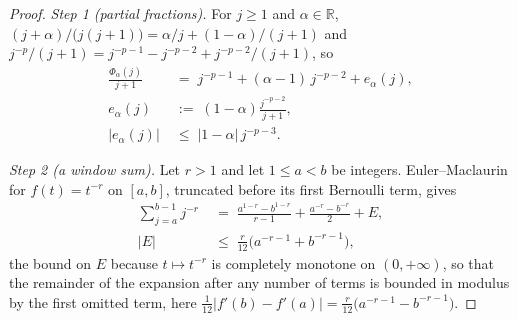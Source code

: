 \begin{proof}
\emph{Step 1 (partial fractions).} For $j\geq1$ and $\alpha\in\mathbb R$,
$(j+\alpha)/\bigl(j(j+1)\bigr)=\alpha/j+(1-\alpha)/(j+1)$ and
$j^{-p}/(j+1)=j^{-p-1}-j^{-p-2}+j^{-p-2}/(j+1)$, so
\begin{equation}\label{eq:doubling_pf}
\begin{aligned}
    \frac{\Phi_\alpha(j)}{j+1}\;&=\;j^{-p-1}+(\alpha-1)\,j^{-p-2}+e_\alpha(j),\\
    e_\alpha(j)\;&:=\;(1-\alpha)\frac{j^{-p-2}}{j+1},\\
    |e_\alpha(j)|\;&\leq\;|1-\alpha|\,j^{-p-3} .
\end{aligned}
\end{equation}

\emph{Step 2 (a window sum).} Let $r>1$ and let $1\leq a<b$ be integers. Euler--Maclaurin for
$f(t)=t^{-r}$ on $[a,b]$, truncated before its first Bernoulli term, gives
\begin{equation}\label{eq:doubling_em}
\begin{aligned}
    \sum_{j=a}^{b-1}j^{-r}\;&=\;\frac{a^{1-r}-b^{1-r}}{r-1}+\frac{a^{-r}-b^{-r}}{2}+E,\\
    |E|\;&\leq\;\frac{r}{12}\bigl(a^{-r-1}+b^{-r-1}\bigr),
\end{aligned}
\end{equation}
the bound on $E$ because $t\mapsto t^{-r}$ is completely monotone on $(0,+\infty)$, so that the
remainder of the expansion after any number of terms is bounded in modulus by the first
omitted term, here $\tfrac1{12}|f'(b)-f'(a)|=\tfrac{r}{12}\bigl(a^{-r-1}-b^{-r-1}\bigr)$.


\end{proof}
